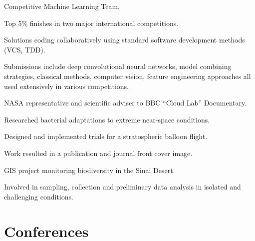 \documentclass[]{Finlay_Maguire_CV}
\begin{document}
\begin{minipage}[t]{0.66\textwidth}
\begin{tightemize}
\item Competitive Machine Learning Team.
\item Top 5\% finishes in two major international competitions.
\item Solutions coding collaboratively using standard software development methods (VCS, TDD).
\item Submissions include deep convolutional neural networks, model combining strategies, classical methods, computer vision, feature engineering approaches all used extensively in various competitions.
\end{tightemize}
    \vspace{-0.3cm}

\sectionsep
{}
\begin{tightemize}
\item NASA representative and scientific adviser to BBC ``Cloud Lab'' Documentary.
\item Researched bacterial adaptations to extreme near-space conditions.
\item Designed and implemented trials for a stratospheric balloon flight.
\item Work resulted in a publication and journal front cover image.
\end{tightemize}
\sectionsep
    \vspace{-0.3cm}
\begin{tightemize}
\item GIS project monitoring biodiversity in the Sinai Desert.
\item Involved in sampling, collection and preliminary data analysis in isolated and challenging conditions.
\end{tightemize}
\sectionsep
    \vspace{-0.3cm}

\section{Conferences}


\end{minipage}
\end{document}
